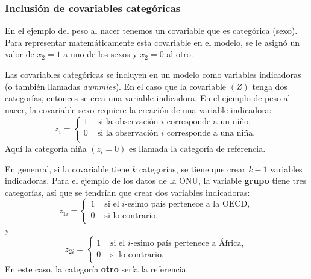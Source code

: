 \documentclass[
]{article}
\begin{document}
\subsubsection{Inclusión de covariables categóricas}\label{inclusiuxf3n-de-covariables-categuxf3ricas}

En el ejemplo del peso al nacer tenemos un covariable que es categórica (sexo). Para representar matemáticamente esta covariable en el modelo, se le asignó un valor de \(x_2=1\) a uno de los sexos y \(x_2=0\) al otro.

Las covariables categóricas se incluyen en un modelo como variables indicadoras (o también llamadas \emph{dummies}). En el caso que la covariable \((Z)\) tenga dos categorías, entonces se crea una variable indicadora. En el ejemplo de peso al nacer, la covariable sexo requiere la creación de una variable indicadora:
\[
z_{i} = \begin{cases}
1 & \mbox{ si la observación $i$ corresponde a un niño}, \\
0 & \mbox{ si la observación $i$ corresponde a una niña}. \\
\end{cases}
\]
Aquí la categoría niña \((z_i=0)\) es llamada la categoría de referencia.

En genenral, si la covariable tiene \(k\) categorías, se tiene que crear \(k-1\) variables indicadoras. Para el ejemplo de los datos de la ONU, la variable \textbf{grupo} tiene tres categorías, así que se tendrían que crear dos variables indicadoras:
\[
z_{1i} = \begin{cases}
1 & \mbox{ si el $i$-esimo país pertenece a la OECD}, \\
0 & \mbox{ si lo contrario}. \\
\end{cases}
\]
y
\[
z_{2i} = \begin{cases}
1 & \mbox{ si el $i$-esimo país pertenece a África}, \\
0 & \mbox{ si lo contrario}. \\
\end{cases}
\]
En este caso, la categoría \textbf{otro} sería la referencia.
\end{document}

